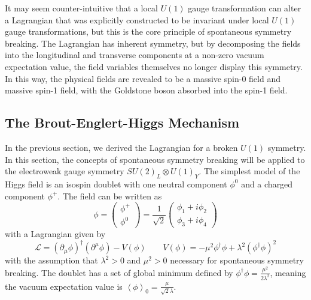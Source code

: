 It may seem counter-intuitive that a local $U(1)$ gauge transformation can alter a Lagrangian that was explicitly constructed to be invariant under local $U(1)$ gauge transformations, but this is the core principle of spontaneous symmetry breaking. The Lagrangian has inherent symmetry, but by decomposing the fields into the longitudinal and transverse components at a non-zero vacuum expectation value, the field variables themselves no longer display this symmetry. In this way, the physical fields are revealed to be a massive spin-0 field and massive spin-1 field, with the Goldstone boson absorbed into the spin-1 field.

\subsection{The Brout-Englert-Higgs Mechanism} \label{sec:sm_theory_beh}
In the previous section, we derived the Lagrangian for a broken $U(1)$ symmetry. In this section, the concepts of spontaneous symmetry breaking will be applied to the electroweak gauge symmetry $SU(2)_L\otimes U(1)_Y$. The simplest model of the Higgs field is an isospin doublet with one neutral component $\phi^0$ and a charged component $\phi^+$. The field can be written as
\begin{equation}
	\phi=\begin{pmatrix}\phi^+\\\phi^0\end{pmatrix}=\frac{1}{\sqrt{2}}\begin{pmatrix}\phi_1+i\phi_2\\\phi_3+i\phi_4\end{pmatrix}
\end{equation}
with a Lagrangian given by
\begin{equation}
	\mathcal{L}=(\partial_\mu\phi)^\dagger(\partial^\mu\phi)-V(\phi) \qquad V(\phi)=-\mu^2\phi^\dagger\phi+\lambda^2(\phi^\dagger\phi)^2
\end{equation}
with the assumption that $\lambda^2>0$ and $\mu^2>0$ necessary for spontaneous symmetry breaking.  The doublet has a set of global minimum defined by $\phi^\dagger\phi=\frac{\mu^2}{2\lambda^2}$, meaning the vacuum expectation value is $\left<\phi\right>_0=\frac{\mu}{\sqrt{2}\lambda}$.

